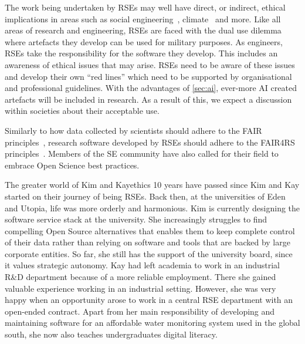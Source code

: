 \documentclass{eceasst}
\begin{document}
The work being undertaken by RSEs may well have direct, or indirect,
ethical implications in areas such as social engineering~\cite{s2erc,Siadati2024},
climate~\cite{Lannelongue2023} and more.
Like all areas of research and engineering, RSEs are faced with the dual use dilemma~\cite{Bobier2024} where artefacts they develop can be used for military purposes.
As engineers, RSEs take the responsibility for the software they develop.
This includes an awareness of ethical issues that may arise.
RSEs need to be aware of these issues and develop their own ``red lines''
which need to be supported by organisational and professional guidelines.
With the advantages of \autoref{sec:ai}, ever-more AI created artefacts will be included in research.
As a result of this, we expect a discussion within societies about their acceptable use.

Similarly to how data collected by scientists should adhere to the FAIR principles~\cite{FAIR},
research software developed by RSEs should adhere to the FAIR4RS principles~\cite{FAIR4RS}.
Members of the SE community have also called for their field to embrace Open Science best practices\cite{OliveiraJr2024,Druskat2025}.

\begin{story}{The greater world of Kim and Kay}{ethics}
10 years have passed since Kim and Kay started on their journey of being RSEs. Back then,
at the universities of Eden and Utopia, life was more orderly and harmonious.
Kim is currently designing the software service stack at the university.
She increasingly struggles to find compelling Open Source alternatives that enables them to keep complete control of their data
rather than relying on software and tools that are backed by large corporate entities.
So far, she still has the support of the university board, since it values strategic autonomy.
Kay had left academia to work in an industrial R\&D department because of a more reliable employment.
There she gained valuable experience working in an industrial setting.
However, she was very happy when an opportunity arose to work in a central
RSE department with an open-ended contract. Apart from her main responsibility
of developing and maintaining software for an affordable water monitoring system
used in the global south, she now also teaches undergraduates digital literacy.
\end{story}
\end{document}
